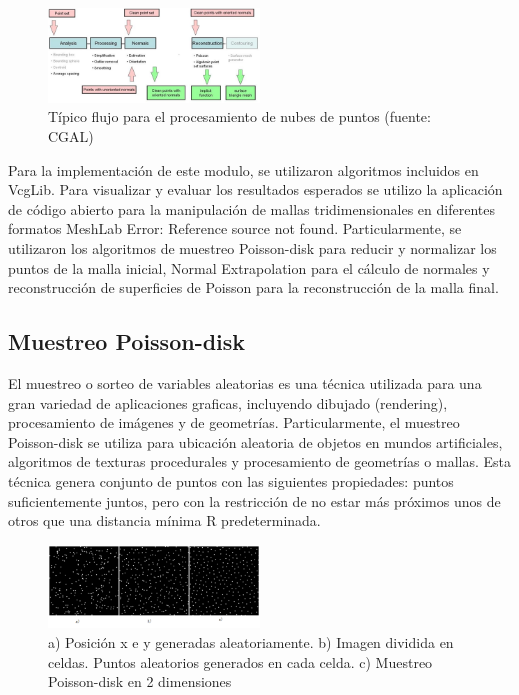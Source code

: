 \begin{figure}[H]
  \centering
    \includegraphics[width=0.5\textwidth]{./Cap6_reconstruccion/malla-flow.png}
  \caption{Típico flujo para el procesamiento de nubes de puntos (fuente: CGAL\cite{CGAL})}
  \label{fig:Mesh-CGAL}
\end{figure}

Para la implementación de este modulo, se utilizaron algoritmos incluidos en VcgLib. Para visualizar y evaluar los resultados esperados se utilizo la aplicación de código abierto para la manipulación de mallas tridimensionales en diferentes formatos MeshLab Error: Reference source not found. Particularmente, se utilizaron los algoritmos de muestreo Poisson-disk para reducir y normalizar los puntos de la malla inicial, Normal Extrapolation para el cálculo de normales y reconstrucción de superficies de Poisson para la reconstrucción de la malla final.

\subsection{Muestreo Poisson-disk}

El muestreo o sorteo de variables aleatorias es una técnica utilizada para una gran variedad de aplicaciones graficas, incluyendo dibujado (rendering), procesamiento de imágenes y de geometrías.
Particularmente, el muestreo Poisson-disk se utiliza para ubicación aleatoria de objetos en mundos artificiales, algoritmos de texturas procedurales y procesamiento de geometrías o mallas. Esta técnica genera conjunto de puntos con las siguientes propiedades: puntos suficientemente juntos, pero con la restricción de no estar más próximos unos de otros que una distancia mínima R predeterminada.

\begin{figure}[H]
  \centering
    \includegraphics[width=0.5\textwidth]{./Cap6_reconstruccion/malla-poisson.png}
  \caption{a) Posición x e y generadas aleatoriamente. b) Imagen dividida en celdas. Puntos aleatorios generados en cada celda. c) Muestreo Poisson-disk en 2 dimensiones}
  \label{fig:Mesh-Poisson}
\end{figure}

